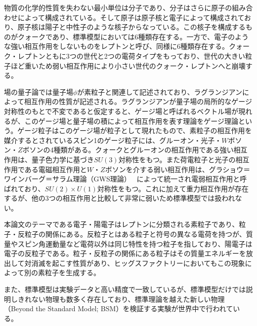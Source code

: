 物質の化学的性質を失わない最小単位は分子であり、分子はさらに原子の組み合わせによって構成されている。そして原子は原子核と電子によって構成されており、原子核は陽子と中性子のような核子からなっている。この核子を構成するものがクォークであり、標準模型においては6種類存在する。一方で、電子のような強い相互作用をしないものをレプトンと呼び、同様に6種類存在する。クォーク・レプトンともに3つの世代と2つの電荷タイプをもっており、世代の大きい粒子ほど重いため弱い相互作用により小さい世代のクォーク・レプトンへと崩壊する。

場の量子論では量子場$\phi$が素粒子と関連して記述されており、ラグランジアンによって相互作用の性質が記述される。ラグランジアンが量子場の局所的なゲージ対称性のもとで不変であると仮定すると、ゲージ場と呼ばれるベクトル場が現れるが、このゲージ場と量子場の積によって相互作用を表す理論をゲージ理論という。ゲージ粒子はこのゲージ場が粒子として現れたもので、素粒子の相互作用を媒介するとされているスピン1のゲージ粒子には、グルーオン・光子・$W$ボソン・$Z$ボソンの4種類がある。クォークとグルーオンの相互作用である強い相互作用は、量子色力学に基づき$SU(3)$対称性をもつ。また荷電粒子と光子の相互作用である電磁相互作用と$W$・$Z$ボソンを介する弱い相互作用は、グラショウ＝ワインバーグ＝サラム理論（GWS理論）~ \cite{gws}によって統一され電弱相互作用と呼ばれており、$SU(2)\times U(1)$対称性をもつ。これに加えて重力相互作用が存在するが、他の3つの相互作用と比較して非常に弱いため標準模型では扱われない。

本論文のテーマである電子・陽電子はレプトンに分類される素粒子であり、粒子・反粒子の関係にある。反粒子とはある粒子と符号の異なる電荷を持つが、質量やスピン角運動量など電荷以外は同じ特性を持つ粒子を指しており、陽電子は電子の反粒子である。粒子・反粒子の関係にある粒子はその質量エネルギーを放出して対消滅を起こす性質があり、ヒッグスファクトリーにおいてもこの現象によって別の素粒子を生成する。

また、標準模型は実験データと高い精度で一致しているが、標準模型だけでは説明しきれない物理も数多く存在しており、標準理論を越えた新しい物理（Beyond the Standard Model; BSM）を検証する実験が世界中で行われている。

